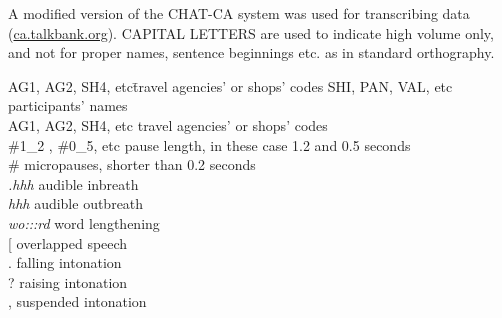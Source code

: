 \documentclass[output=paper]{langscibook}
\begin{document}
A modified version of the CHAT-CA system was used for transcribing data (\url{ca.talkbank.org}). CAPITAL LETTERS are used to indicate high volume only, and not for proper names, sentence beginnings etc. as in standard orthography.

\begin{tabbing}
AG1, AG2, SH4, etc\hspace{2ex}\= travel agencies’ or shops’ codes\kill
SHI, PAN, VAL, etc \> participants’ names\\
AG1, AG2, SH4, etc \> travel agencies’ or shops’ codes\\
\#1\_2 , \#0\_5, etc \> pause length, in these case 1.2 and 0.5 seconds\\
\# \> micropauses, shorter than 0.2 seconds\\
\textit{.hhh} \> audible inbreath\\
\textit{hhh} \>  audible outbreath\\
\textit{wo:::rd} \> word lengthening\\
{[} \> overlapped speech\\
. \> falling intonation\\
? \> raising intonation\\
, \> suspended intonation\\
\end{tabbing}

\printbibliography[heading=subbibliography,notkeyword=this]
\end{document}
